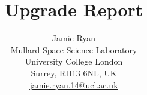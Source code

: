\documentclass[11pt]{article}
\title{Upgrade Report}
\author{Jamie Ryan \\
Mullard Space Science Laboratory \\
University College London \\
Surrey, RH13 6NL, UK\\
\href{mailto:jamie.ryan.14@ucl.ac.uk}{jamie.ryan.14@ucl.ac.uk}
\date{}}
\begin{document}
\maketitle
\tableofcontents

%

%
%
%
%
%

%


\label{Bibliography}
%
\end{document}
